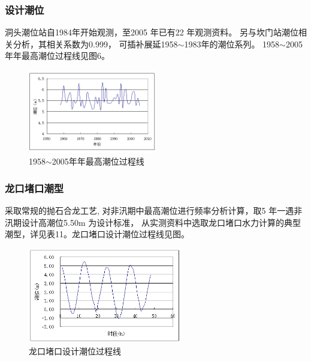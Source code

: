 \documentclass[UTF8, a4paper, 12pt]{ctexart} %
\begin{document}
\subsubsection{设计潮位}
洞头潮位站自1984年开始观测，至2005 年已有22 年观测资料。
另与坎门站潮位相关分析，其相关系数为0.999，
可插补展延1958$\sim$1983年的潮位系列。
1958$\sim$2005年年最高潮位过程线见图6。







\begin{figure}[h]
    \centering
    \includegraphics[width=0.5\textwidth]{7.png}
    \caption{1958$\sim$2005年年最高潮位过程线}
    \label{fig:annual_highest_tide_level}
\end{figure}
\subsubsection{龙口堵口潮型 }
采取常规的抛石合龙工艺, 对非汛期中最高潮位进行频率分析计算，取5 年一遇非汛期设计高潮位5.50m 为设计标准，
从实测资料中选取龙口堵口水力计算的典型潮型，详见表11。龙口堵口设计潮位过程线见图。
\begin{figure}[h]
    \centering
    \includegraphics[width=0.6\textwidth]{8.png}
    \caption{龙口堵口设计潮位过程线}
    \label{fig:dragon_port_tide_level}
    
\end{figure}
\end{document}
